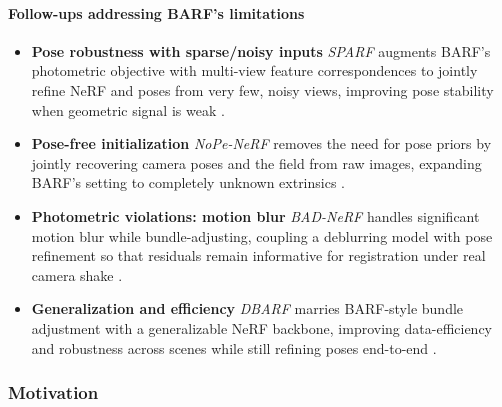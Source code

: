 \begin{enrichment}
\begin{enrichment}
        \paragraph{Follow-ups addressing BARF’s limitations}
        \begin{itemize}
            \item \textbf{Pose robustness with sparse/noisy inputs}\; \emph{SPARF} augments BARF’s photometric objective with multi-view feature correspondences to jointly refine NeRF and poses from very few, noisy views, improving pose stability when geometric signal is weak \cite{truong2023_sparf}. 
            \item \textbf{Pose-free initialization}\; \emph{NoPe-NeRF} removes the need for pose priors by jointly recovering camera poses and the field from raw images, expanding BARF’s setting to completely unknown extrinsics \cite{bian2023_nopenerf}. 
            \item \textbf{Photometric violations: motion blur}\; \emph{BAD-NeRF} handles significant motion blur while bundle-adjusting, coupling a deblurring model with pose refinement so that residuals remain informative for registration under real camera shake \cite{wang2023_badnerf}.
            \item \textbf{Generalization and efficiency}\; \emph{DBARF} marries BARF-style bundle adjustment with a generalizable NeRF backbone, improving data-efficiency and robustness across scenes while still refining poses end-to-end \cite{chen2023_dbarf}. 
        \end{itemize}            
        
    \end{enrichment}
    
    
    \begin{enrichment}
        \label{enr:subsec_chapter23_nerfw}
        
        \subsubsection{Motivation}
        \label{subsec:chapter23_nerfw_motivation}
        

\end{enrichment}
\end{enrichment}
